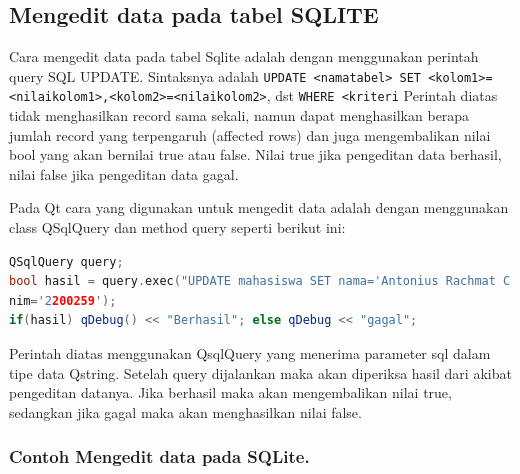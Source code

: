 \subsection{Mengedit data pada tabel SQLITE}\label{mengedit-data-pada-tabel-sqlite}

Cara mengedit data pada tabel Sqlite adalah dengan menggunakan perintah
query SQL UPDATE. Sintaksnya adalah
\texttt{UPDATE\ \textless{}namatabel\textgreater{}\ SET\ \textless{}kolom1\textgreater{}=\textless{}nilaikolom1\textgreater{},\textless{}kolom2\textgreater{}=\textless{}nilaikolom2\textgreater{}},
dst \texttt{WHERE\ \textless{}kriteri} Perintah diatas tidak
menghasilkan record sama sekali, namun dapat menghasilkan berapa jumlah
record yang terpengaruh (affected rows) dan juga mengembalikan nilai
bool yang akan bernilai true atau false. Nilai true jika pengeditan data
berhasil, nilai false jika pengeditan data gagal.

Pada Qt cara yang digunakan untuk mengedit data adalah dengan
menggunakan class QSqlQuery dan method query seperti berikut ini:

\begin{lstlisting}[language=c++, caption=menggunakan class QSqlQuery dan method query]
QSqlQuery query;
bool hasil = query.exec("UPDATE mahasiswa SET nama='Antonius Rachmat C' WHERE
nim='2200259');
if(hasil) qDebug() << "Berhasil"; else qDebug << "gagal";
\end{lstlisting}

Perintah diatas menggunakan QsqlQuery yang menerima parameter sql dalam
tipe data Qstring. Setelah query dijalankan maka akan diperiksa hasil
dari akibat pengeditan datanya. Jika berhasil maka akan mengembalikan
nilai true, sedangkan jika gagal maka akan menghasilkan nilai false.

\subsubsection*{Contoh Mengedit data pada SQLite.}

